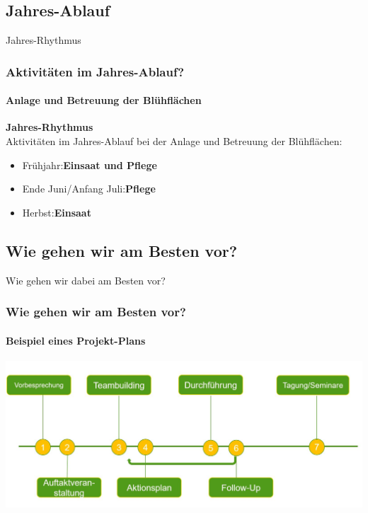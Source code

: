 \documentclass[aspectratio=169]{beamer}
\begin{document}
\subsection[Jahr]{Jahres-Ablauf}

\begin{frame}{Jahres-Rhythmus}
\frametitle{Aktivitäten im Jahres-Ablauf?} 
\framesubtitle{Anlage und Betreuung der Blühflächen}

\textbf{Jahres-Rhythmus}\\
Aktivitäten im Jahres-Ablauf bei der Anlage und Betreuung der Blühflächen:

\begin{itemize}
	\item 
	Frühjahr:\pause   \textbf{Einsaat und Pflege}
	 \pause 
	\item 
	Ende Juni/Anfang Juli:\pause    \textbf{Pflege} \pause
	\item 
	Herbst:\pause    \textbf{Einsaat}%

\end{itemize}
\end{frame}


\subsection[Vorgehen]{Wie gehen wir am Besten vor?}

\begin{frame}{Wie gehen wir dabei am Besten vor?}
\frametitle{Wie gehen wir am Besten vor?} 
\framesubtitle{Beispiel eines Projekt-Plans}
\begin{center}
	
\includegraphics[width=1.0\textwidth]{figures/Ablaufschema.JPG}

\end{center}
\end{frame}

\end{document}
